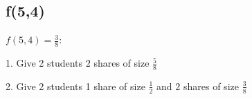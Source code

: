 \documentclass[a4paper]{article}
\begin{document}
\subsection{f(5,4)}
\hspace{4ex}
$f(5,4) = \frac{3}{8}$:

\noindent
\hspace{4ex}
1. Give 2 students $2$ shares of size $\frac{5}{8}$

\noindent
\hspace{4ex}
2. Give 2 students 1 share of size $\frac{1}{2}$ and $2$ shares of size $\frac{3}{8}$
\end{document}
